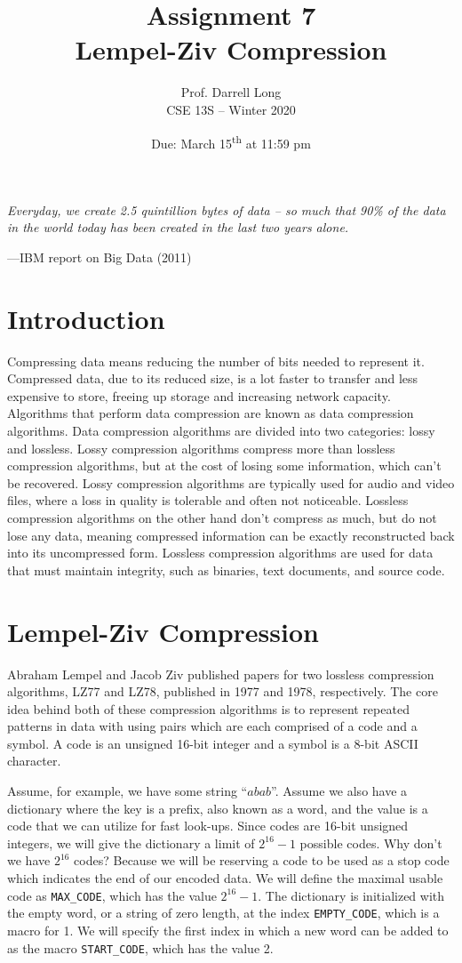 \documentclass{article}
\title{Assignment 7 \\ Lempel-Ziv Compression}
\author{Prof. Darrell Long \\
CSE 13S -- Winter 2020}
\date{Due: March 15\textsuperscript{th} at 11:59 pm}
\begin{document}
\maketitle

\lstset{language=C, style=c99}

\textwidth
\epigraph{\emph{Everyday, we create 2.5 quintillion bytes of data -- so much
that 90\% of the data in the world today has been created in the last two years
alone.}}{---IBM report on Big Data (2011)}

\section{Introduction}
Compressing data means reducing the number of bits needed to represent it.
Compressed data, due to its reduced size, is a lot faster to transfer and less
expensive to store, freeing up storage and increasing network capacity.
Algorithms that perform data compression are known as data compression
algorithms. Data compression algorithms are divided into two categories: lossy
and lossless.  Lossy compression algorithms compress more than lossless
compression algorithms, but at the cost of losing some information, which can't
be recovered. Lossy compression algorithms are typically used for audio and
video files, where a loss in quality is tolerable and often not noticeable.
Lossless compression algorithms on the other hand don't compress as much, but do
not lose any data, meaning compressed information can be exactly reconstructed
back into its uncompressed form. Lossless compression algorithms are used for
data that must maintain integrity, such as binaries, text documents, and source
code.

\section{Lempel-Ziv Compression}
Abraham Lempel and Jacob Ziv published papers for two lossless compression
algorithms, LZ77 and LZ78, published in 1977 and 1978, respectively. The core
idea behind both of these compression algorithms is to represent repeated
patterns in data with using pairs which are each comprised of a code and a
symbol. A code is an unsigned 16-bit integer and a symbol is a 8-bit ASCII
character.

Assume, for example, we have some string ``$abab$''. Assume we also have a
dictionary where the key is a prefix, also known as a word, and the value is a
code that we can utilize for fast look-ups. Since codes are 16-bit unsigned
integers, we will give the dictionary a limit of $2^{16} - 1$ possible codes.
Why don't we have $2^{16}$ codes? Because we will be reserving a code to be used
as a stop code which indicates the end of our encoded data. We will define the
maximal usable code as \texttt{MAX\_CODE}, which has the value $2^{16} - 1$. The
dictionary is initialized with the empty word, or a string of zero length, at
the index \texttt{EMPTY\_CODE}, which is a macro for 1. We will specify the
first index in which a new word can be added to as the macro
\texttt{START\_CODE}, which has the value 2.
\end{document}
